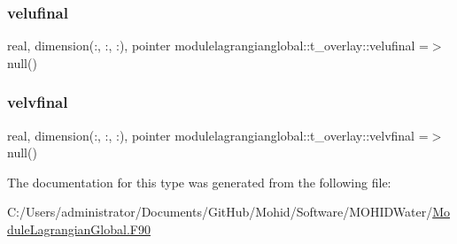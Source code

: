 \subsubsection{\texorpdfstring{velufinal}{velufinal}}
{\footnotesize\ttfamily real, dimension(\+:, \+:, \+:), pointer modulelagrangianglobal\+::t\+\_\+overlay\+::velufinal =$>$ null()\hspace{0.3cm}{\ttfamily [private]}}

\mbox{\label{structmodulelagrangianglobal_1_1t__overlay_a272b2d0ba6db0e45afbf63e22176872a}} 
\subsubsection{\texorpdfstring{velvfinal}{velvfinal}}
{\footnotesize\ttfamily real, dimension(\+:, \+:, \+:), pointer modulelagrangianglobal\+::t\+\_\+overlay\+::velvfinal =$>$ null()\hspace{0.3cm}{\ttfamily [private]}}



The documentation for this type was generated from the following file\+:\begin{DoxyCompactItemize}
\item 
C\+:/\+Users/administrator/\+Documents/\+Git\+Hub/\+Mohid/\+Software/\+M\+O\+H\+I\+D\+Water/\mbox{\hyperlink{_module_lagrangian_global_8_f90}{Module\+Lagrangian\+Global.\+F90}}\end{DoxyCompactItemize}
